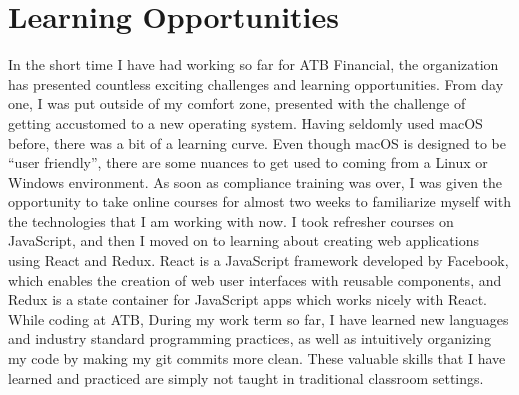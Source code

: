 \documentclass[letterpaper,12pt]{article}
\begin{document}


\section{Learning Opportunities}

In the short time I have had working so far for ATB Financial, the organization has presented
countless exciting challenges and learning opportunities.
From day one, I was put outside of my comfort zone, presented with the challenge of
getting accustomed to a new operating system. Having seldomly used macOS before,
there was a bit of a learning curve. Even though macOS is designed to be ``user friendly'',
there are some nuances to get used to coming from a Linux or Windows environment.
As soon as compliance training was over, I was given the opportunity to take online
courses for almost two weeks to familiarize myself with the technologies that I am
working with now. I took refresher courses on JavaScript, and then I moved on to learning
about creating web applications using React and Redux. React is a JavaScript framework developed by Facebook,
which enables the creation of web user interfaces 
with reusable components\cite{react}, and Redux is a state container
for JavaScript apps\cite{redux} which works nicely with React. While coding at ATB,
During my work term so far, I have learned new languages and industry standard programming
practices, as well as intuitively organizing my code by making my git commits more clean.
These valuable skills that I have learned and practiced are simply not taught in traditional classroom settings.
\end{document}
